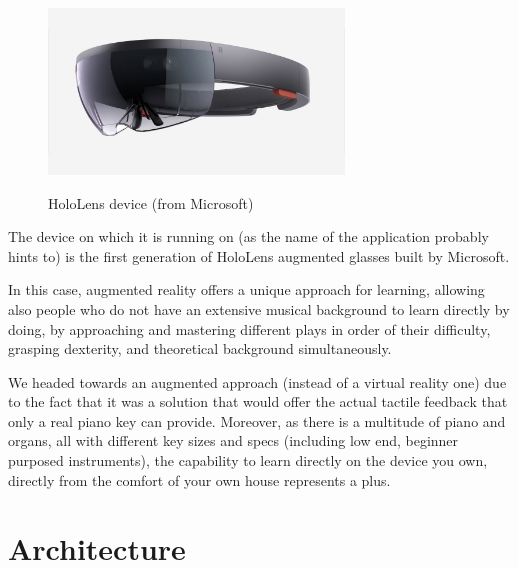 \documentclass[12 pct]{report}
\begin{document}
\begin{figure}[H]
\includegraphics[width=0.7\textwidth]{hololens}
\centering
\label{fig:hololens}
\caption{HoloLens device (from Microsoft)}
\end{figure}

The device on which it is running on (as the name of the application probably hints to) is the first generation of HoloLens augmented glasses built by Microsoft.


In this case, augmented reality offers a unique approach for learning, allowing also people who do not have an extensive musical background to learn directly by doing, by approaching and mastering different plays in order of their difficulty, grasping dexterity, and theoretical background simultaneously.

We headed towards an augmented approach (instead of a virtual reality one) due to the fact that it was a solution that would offer the actual tactile feedback that only a real piano key can provide. Moreover, as there is a multitude of piano and organs, all with different key sizes and specs (including low end, beginner purposed instruments), the capability to learn directly on the device you own, directly from the comfort of your own house represents a plus.

\section{Architecture}
\end{document}
